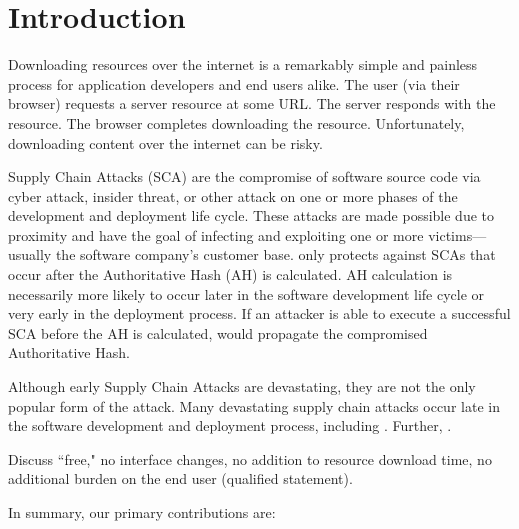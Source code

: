 \section{Introduction} \label{sec:introduction}

Downloading resources over the internet is a remarkably simple and painless
process for application developers and end users alike. The user (via their
browser) requests a server resource at some URL. The server responds with the
resource. The browser completes downloading the resource. Unfortunately,
downloading content over the internet can be risky.

Supply Chain Attacks (SCA) are the compromise of software source code via cyber
attack, insider threat, or other attack on one or more phases of the development
and deployment life cycle. These attacks are made possible due to proximity and
have the goal of infecting and exploiting one or more victims---usually the
software company's customer base. \SYSTEM{} only protects against SCAs that
occur after the Authoritative Hash (AH) is calculated. AH calculation is
necessarily more likely to occur later in the software development life cycle or
very early in the deployment process. If an attacker is able to execute a
successful SCA before the AH is calculated, \SYSTEM{} would propagate the
compromised Authoritative Hash.


Although early Supply Chain Attacks are devastating, they are not the only
popular form of the attack. Many devastating supply chain attacks occur late in
the software development and deployment process, including . Further, .

Discuss ``free," \ie no interface changes, no addition to resource download
time, no additional burden on the end user (qualified statement).~\cite{DNSSEC}

In summary, our primary contributions are:

